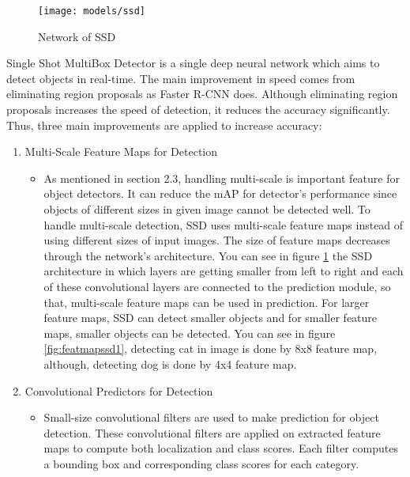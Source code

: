 \documentclass{article}
\begin{document}
\setlength{\parindent}{6ex}

\begin{figure}
    \centering
    \texttt{[image: models/ssd]}
    \caption{Network of SSD}
    \label{fig:ssd1}
\end{figure}

\indent

Single Shot MultiBox Detector \cite{ssdcite} is a single deep neural network which aims to detect 
objects in real-time. The main improvement in speed comes from eliminating region 
proposals as Faster R-CNN does. Although eliminating region proposals increases 
the speed of detection, it reduces the accuracy significantly. Thus, three main 
improvements are applied to increase accuracy:

\begin{enumerate}
    \item Multi-Scale Feature Maps for Detection
    \begin{itemize}
        \item As mentioned in section 2.3, handling multi-scale is important feature 
for object detectors. It can reduce the mAP for detector's performance since objects 
of different sizes in given image cannot be detected well. To handle multi-scale detection, 
SSD uses multi-scale feature maps instead of using different sizes of input images. 
The size of feature maps decreases through the network's architecture. You can see in figure 
\ref{fig:ssd1} the SSD architecture in which layers are getting smaller from left to right and 
each of these convolutional layers are connected to the prediction module, so that, multi-scale 
feature maps can be used in prediction. For larger feature maps, SSD can detect smaller objects 
and for smaller feature maps, smaller objects can be detected. You can see in figure 
\ref{fig:featmapssd1}, detecting cat in image is done by 8x8 feature map, although, detecting 
dog is done by 4x4 feature map.
    \end{itemize}
    \item Convolutional Predictors for Detection
    \begin{itemize}
        \item Small-size convolutional filters are used to make prediction for 
object detection. These convolutional filters are applied on extracted feature maps 
to compute both localization and class scores. Each filter computes a bounding box and 
corresponding class scores for each category.
    \end{itemize}

\end{enumerate}
\end{document}
